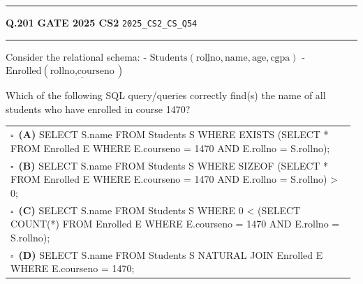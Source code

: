 \documentclass[a4paper,10pt]{article}
\begin{document}
\vspace{6pt}\hrule height 0.35pt\vspace{6pt}
\noindent
\begin{tcolorbox}[
    blanker,
    sidebyside,
    sidebyside align=top,
    lefthand width=0.55\textwidth,
    top=4pt, bottom=4pt, left=0pt, right=0pt,
    middle=16pt,
    underlay={
        \draw[dashed, black!80, line width=0.8pt, dash pattern=on 4pt off 3pt]
            ([xshift=0.55\textwidth+8pt]frame.north west) --
            ([xshift=0.55\textwidth+8pt]frame.south west);
    }
]
\textbf{Q.201}  \hfill {\footnotesize\textbf{GATE 2025 CS2} \quad \tiny\texttt{2025\_CS2\_CS\_Q54}}
\vspace{2pt}\hrule height 0.3pt\vspace{4pt}

Consider the relational schema:
- $\text{Students}(\underline{\text{rollno}}, \text{name}, \text{age}, \text{cgpa})$
- $\text{Enrolled}(\underline{\text{rollno}, \text{courseno}})$
\par\medskip
Which of the following SQL query/queries correctly find(s) the name of all students who have enrolled in course 1470?

\par\vspace{6pt}\noindent
\begin{tabular}{@{}p{0.98\linewidth}@{}}
$\square$\ \textbf{(A)} SELECT S.name \newline FROM Students S \newline WHERE EXISTS (SELECT * FROM Enrolled E WHERE E.courseno = 1470 AND E.rollno = S.rollno); \\
\addlinespace[3pt]
$\square$\ \textbf{(B)} SELECT S.name \newline FROM Students S \newline WHERE SIZEOF (SELECT * FROM Enrolled E WHERE E.courseno = 1470 AND E.rollno = S.rollno) > 0; \\
\addlinespace[3pt]
$\square$\ \textbf{(C)} SELECT S.name \newline FROM Students S \newline WHERE 0 < (SELECT COUNT(*) FROM Enrolled E WHERE E.courseno = 1470 AND E.rollno = S.rollno); \\
\addlinespace[3pt]
$\square$\ \textbf{(D)} SELECT S.name \newline FROM Students S NATURAL JOIN Enrolled E \newline WHERE E.courseno = 1470;
\end{tabular}


\end{tcolorbox}
\end{document}
